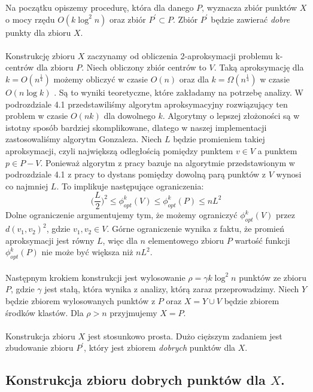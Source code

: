 \noindent
Na początku opiszemy procedurę, która dla danego $P$, wyznacza zbiór punktów $X$ o mocy rzędu $O(k \log^{2}n)$ oraz zbiór $P^{'} \subset P$.
Zbiór $P^{'}$ będzie zawierać \textit{dobre} punkty dla zbioru $X$.
\\~\\
Konstrukcję zbioru $X$ zaczynamy od obliczenia 2-aproksymacji problemu k-centrów dla zbioru $P$.
Niech obliczony zbiór centrów to $V$.
Taką aproksymację dla $k = O(n^{\frac{1}{4}})$ możemy obliczyć w czasie $O(n)$ oraz dla $k = \Omega(n^{\frac{1}{4}})$ w czasie $O(n \log k)$ \cite{10.1145/62212.62255}.
Są to wyniki teoretyczne, które zakładamy na potrzebę analizy.
W podrozdziale 4.1 przedstawiliśmy algorytm aproksymacyjny rozwiązujący ten problem w czasie $O(nk)$ dla dowolnego $k$.
Algorytmy o lepszej złożoności są w istotny sposób bardziej skomplikowane, dlatego w naszej implementacji zastosowaliśmy algorytm Gonzaleza.
Niech $L$ będzie promieniem takiej aproksymacji, czyli największą odległością pomiędzy punktem $v \in V$ a punktem $p \in P-V$.
Ponieważ algorytm z pracy \cite{10.1145/62212.62255} bazuje na algorytmie przedstawionym w podrozdziale 4.1 z pracy \cite{Gonzalez1985ClusteringTM} to dystans pomiędzy dowolną parą punktów z $V$ wynosi co najmniej $L$.
To implikuje następujące ograniczenia:
\begin{equation}
    \Big( \frac{L}{2 } \Big)^2 \leq \phi_{opt}^{k}(V) \leq \phi_{opt}^{k}(P) \leq nL^{2}
\end{equation}
Dolne ograniczenie argumentujemy tym, że możemy ograniczyć $\phi_{opt}^{k}(V)$ przez $d(v_{1}, v_{2})^2$, gdzie $v_{1}, v_{2} \in V$.
Górne ograniczenie wynika z faktu, że promień aproksymacji jest równy $L$, więc dla $n$ elementowego zbioru $P$ wartość funkcji $\phi_{opt}^{k}(P)$ nie może być większa niż $nL^2$.
\\~\\
Następnym krokiem konstrukcji jest wylosowanie $\rho = \gamma k \log^{2} n$ punktów ze zbioru $P$, gdzie $\gamma$ jest stałą, która wynika z analizy, którą zaraz przeprowadzimy.
Niech $Y$ będzie zbiorem wylosowanych punktów z $P$ oraz $X = Y \cup V$ będzie zbiorem środków klastów.
Dla $\rho > n$ przyjmujemy $X = P$.
\\~\\
Konstrukcja zbioru $X$ jest stosunkowo prosta.
Dużo cięższym zadaniem jest zbudowanie zbioru $P^{'}$, który jest zbiorem \textit{dobrych} punktów dla $X$.

\subsection{Konstrukcja zbioru dobrych punktów dla $X$.}

